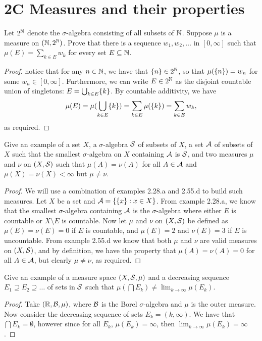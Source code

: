 \section{2C Measures and their properties}


\begin{exercise}{2}
Let $2^{\mathbb{N}}$ denote the $\sigma$-algebra consisting of all subsets of $\mathbb{N}$.
Suppose $\mu$ is a measure on $(\mathbb{N}, 2^{\mathbb{N}})$.
Prove that there is a sequence $w_1,w_2,\dots$ in $[0,\infty]$ such that $\mu(E) = \sum_{k\in E} w_k$ for every set $E \subseteq \mathbb{N}$.
\end{exercise}
\begin{proof}
notice that for any $n\in\mathbb{N}$, we have that $\{n\} \in 2^{\mathbb{N}}$, so that $\mu(\{n\}) = w_n$ for some $w_n \in [0,\infty]$.
Furthermore, we can write $E \in 2^{\mathbb{N}}$ as the disjoint countable union of singletons: $E = \bigcup_{k \in E} \{k\}$.
By countable additivity, we have 
\begin{align*}
    \mu(E) 
    = \mu( \bigcup_{k\in E} \{k\}) 
    = \sum_{k \in E} \mu(\{k\}) 
    = \sum_{k \in E} w_k,
\end{align*}
as required.
\end{proof} 

\begin{exercise}{8}
Give an example of a set $X$, a $\sigma$-algebra $\mathcal{S}$ of subsets of $X$, a set $\mathcal{A}$ of subsets of $X$ such that the smallest $\sigma$-algebra on $X$ containing $\mathcal{A}$ is $\mathcal{S}$, and two measures $\mu$ and $\nu$ on $(X,\mathcal{S})$ such that $\mu(A) = \nu(A)$ for all $A \in \mathcal{A}$ and $\mu(X) = \nu(X) < \infty$ but $\mu \neq \nu$.
\end{exercise}
\begin{proof}
We will use a combination of examples 2.28.a and 2.55.d to build such measures.
Let $X$ be a set and $\mathcal{A} = \{\{x\}: x \in X\}$.
From example 2.28.a, we know that the smallest $\sigma$-algebra containing $\mathcal{A}$ is the $\sigma$-algebra where either $E$ is countable or $X \setminus E$ is countable.
Now let $\mu$ and $\nu$ on $(X, \mathcal{S})$ be defined as $\mu(E) = \nu(E) = 0$ if $E$ is countable, and $\mu(E) = 2$ and $\nu(E) = 3$ if $E$ is uncountable.
From example 2.55.d we know that both $\mu$ and $\nu$ are valid measures on $(X,\mathcal{S})$, and by definition, we have the property that $\mu(A) = \nu(A) = 0$ for all $A\in\mathcal{A}$, but clearly $\mu \neq \nu$, as required.
\end{proof} 

\begin{exercise}{10}
Give an example of a measure space $(X, \mathcal{S}, \mu)$ and a decreasing sequence $E_1 \supseteq E_2 \supseteq \dots$ of sets in $\mathcal{S}$ such that $\mu( \bigcap E_k) \neq \lim_{k\to\infty} \mu(E_k)$.
\end{exercise}
\begin{proof}
Take $(\mathbb{R}, \mathcal{B}, \mu)$, where $\mathcal{B}$ is the Borel $\sigma$-algebra and $\mu$ is the outer measure.
Now consider the decreasing sequence of sets $E_k = (k,\infty)$.
We have that $\bigcap E_k = \emptyset$, however since for all $E_k$, $\mu(E_k) = \infty$, then $\lim_{k\to \infty} \mu(E_k) = \infty$.
\end{proof} 

